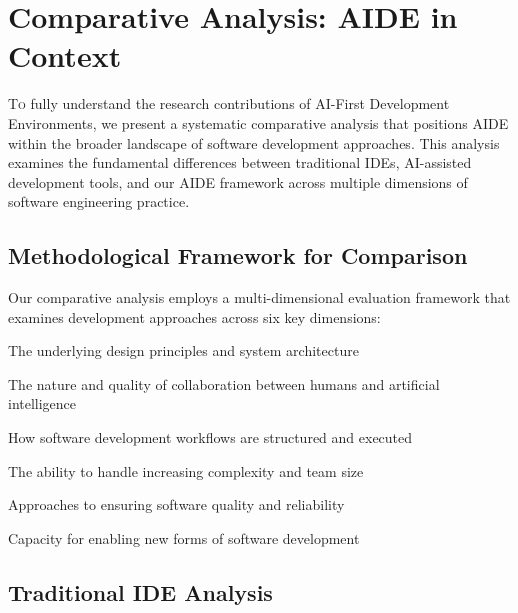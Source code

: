 
\section{Comparative Analysis: AIDE in Context}
\label{sec:comparative-analysis}

\lettrine{T}{o} fully understand the research contributions of AI-First Development Environments, we present a systematic comparative analysis that positions AIDE within the broader landscape of software development approaches. This analysis examines the fundamental differences between traditional IDEs, AI-assisted development tools, and our AIDE framework across multiple dimensions of software engineering practice.

\subsection{Methodological Framework for Comparison}

Our comparative analysis employs a multi-dimensional evaluation framework that examines development approaches across six key dimensions:

\begin{description}[leftmargin=4cm,labelwidth=3.5cm]
    \item[\textbf{Architectural Foundation}] The underlying design principles and system architecture
    \item[\textbf{Human-AI Interaction}] The nature and quality of collaboration between humans and artificial intelligence
    \item[\textbf{Development Process}] How software development workflows are structured and executed
    \item[\textbf{Scalability Characteristics}] The ability to handle increasing complexity and team size
    \item[\textbf{Quality Assurance}] Approaches to ensuring software quality and reliability
    \item[\textbf{Innovation Potential}] Capacity for enabling new forms of software development
\end{description}

\subsection{Traditional IDE Analysis}

